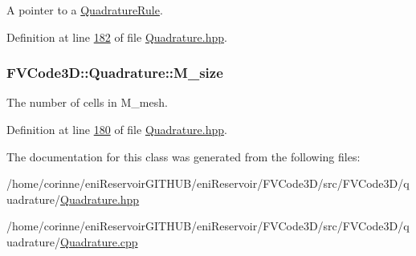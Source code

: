 A pointer to a \hyperlink{classFVCode3D_1_1QuadratureRule}{Quadrature\+Rule}. 



Definition at line \hyperlink{Quadrature_8hpp_source_l00182}{182} of file \hyperlink{Quadrature_8hpp_source}{Quadrature.\+hpp}.

\subsubsection[{\texorpdfstring{M\+\_\+size}{M_size}}]{ F\+V\+Code3\+D\+::\+Quadrature\+::\+M\+\_\+size\hspace{0.3cm}{\ttfamily [protected]}}\hypertarget{classFVCode3D_1_1Quadrature_ae0ab248f031fa026887c4e1fb91a3835}{}\label{classFVCode3D_1_1Quadrature_ae0ab248f031fa026887c4e1fb91a3835}


The number of cells in M\+\_\+mesh. 



Definition at line \hyperlink{Quadrature_8hpp_source_l00180}{180} of file \hyperlink{Quadrature_8hpp_source}{Quadrature.\+hpp}.



The documentation for this class was generated from the following files\+:\begin{DoxyCompactItemize}
\item 
/home/corinne/eni\+Reservoir\+G\+I\+T\+H\+U\+B/eni\+Reservoir/\+F\+V\+Code3\+D/src/\+F\+V\+Code3\+D/quadrature/\hyperlink{Quadrature_8hpp}{Quadrature.\+hpp}\item 
/home/corinne/eni\+Reservoir\+G\+I\+T\+H\+U\+B/eni\+Reservoir/\+F\+V\+Code3\+D/src/\+F\+V\+Code3\+D/quadrature/\hyperlink{Quadrature_8cpp}{Quadrature.\+cpp}\end{DoxyCompactItemize}
